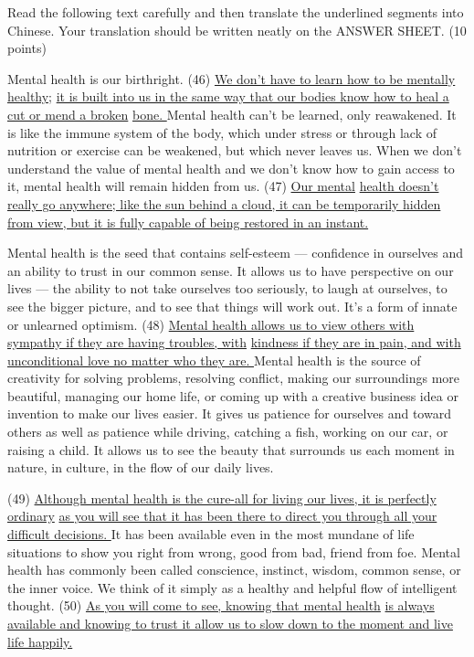 \documentclass[UTF8,11pt]{ctexart}
\begin{document}
Read the following text carefully and then translate the underlined segments into Chinese. Your translation should be written neatly on the ANSWER SHEET. (10 points)


Mental health is our birthright. (46) \uline{We don’t have to learn how to be mentally healthy;} \uline{it is built into us in the same way that our bodies know how to heal a cut or mend a broken} \uline{bone. }Mental health can’t be learned, only reawakened. It is like the immune system of the body, which under stress or through lack of nutrition or exercise can be weakened, but which never leaves us. When we don’t understand the value of mental health and we don’t know how to gain access to it, mental health will remain hidden from us. (47) \uline{Our mental} \uline{health doesn’t really go anywhere; like the sun behind a cloud, it can be temporarily hidden} \uline{from view, but it is fully capable of being restored in an instant.}


Mental health is the seed that contains self-esteem — confidence in ourselves and an ability to trust in our common sense. It allows us to have perspective on our lives — the ability to not take ourselves too seriously, to laugh at ourselves, to see the bigger picture, and to see that things will work out. It’s a form of innate or unlearned optimism. (48) \uline{Mental health allows us to view others with sympathy if they are having troubles, with} \uline{kindness if they are in pain, and with unconditional love no matter who they are. }Mental health is the source of creativity for solving problems, resolving conflict, making our surroundings more beautiful, managing our home life, or coming up with a creative business idea or invention to make our lives easier. It gives us patience for ourselves and toward others as well as patience while driving, catching a fish, working on our car, or raising a child. It allows us to see the beauty that surrounds us each moment in nature, in culture, in the flow of our daily lives.


(49) \uline{Although mental health is the cure-all for living our lives, it is perfectly ordinary} \uline{as you will see that it has been there to direct you through all your difficult decisions. }It has been available even in the most mundane of life situations to show you right from wrong, good from bad, friend from foe. Mental health has commonly been called conscience, instinct, wisdom, common sense, or the inner voice. We think of it simply as a healthy and helpful flow of intelligent thought. (50) \uline{As you will come to see, knowing that mental health} \uline{is always available and knowing to trust it allow us to slow down to the moment and live} \uline{life happily.}
\end{document}
